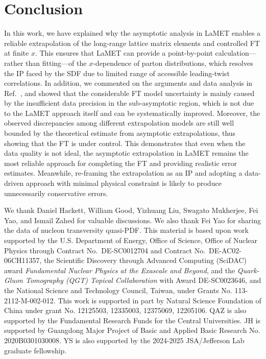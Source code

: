 \documentclass[prd,twocolumn,superscriptaddress,preprintnumbers,showpacs,nofootinbib,notitlepage,floatfix]{revtex4-2}
\begin{document}
\section{Conclusion}
\label{sec:end}

In this work, we have explained why the asymptotic analysis in LaMET enables a reliable extrapolation of the long-range lattice matrix elements and controlled FT at finite $x$. This ensures that LaMET can provide a point-by-point calculation---rather than fitting---of the $x$-dependence of parton distributions, which resolves the IP faced by the SDF due to limited range of accessible leading-twist correlations. In addition, we commented on the arguments and data analysis in Ref.~\cite{Dutrieux:2025jed}, and showed that the considerable FT model uncertainty is mainly caused by the insufficient data precision in the sub-asymptotic region, which is not due to the LaMET approach itself and can be systematically improved. Moreover, the observed discrepancies among different extrapolation models are still well bounded by the theoretical estimate from asymptotic extrapolations, thus showing that the FT is under control. This demonstrates that even when the data quality is not ideal, the asymptotic extrapolation in LaMET remains the most reliable approach for completing the FT and providing realistic error estimates. Meanwhile, re-framing the extrapolation as an IP and adopting a data-driven approach with minimal physical constraint is likely to produce unnecessarily conservative errors.\\

\begin{acknowledgments}
We thank Daniel Hackett, William Good, Yizhuang Liu, Swagato Mukherjee, Fei Yao, and Ismail Zahed for valuable discussions. We also thank Fei Yao for sharing the data of nucleon transversity quasi-PDF.
This material is based upon work supported by the U.S. Department of Energy, Office of Science, Office of Nuclear Physics through Contract No.~DE-SC0012704 and Contract No.~DE-AC02-06CH11357, the Scientific Discovery through Advanced Computing (SciDAC) award \textit{Fundamental Nuclear Physics at the Exascale and Beyond}, and the \textit{Quark-Gluon Tomography (QGT) Topical Collaboration} with Award DE-SC0023646, and the National Science and Technology Council, Taiwan, under Grants No. 113-2112-M-002-012. This work is supported in part by Natural Science Foundation of China under grant No. 12125503,  12335003, 12375069, 12205106. 
QAZ is also supported by the Fundamental Research Funds for the Central Universities. JH is supported by Guangdong Major Project of Basic and Applied Basic Research No. 2020B0301030008. YS is also supported by the 2024-2025 JSA/Jefferson Lab graduate fellowship.

\end{acknowledgments}
\end{document}
